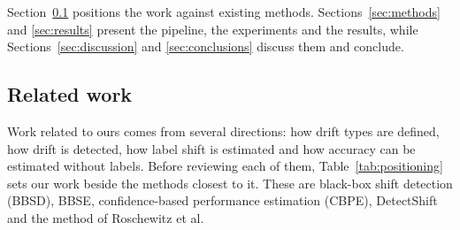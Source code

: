 \documentclass[pdflatex,referee,lineno,sn-basic]{sn-jnl}
\begin{document}
\noindent Section~\ref{sec:sota} positions the work against existing methods. Sections~\ref{sec:methods} and \ref{sec:results} present the pipeline, the experiments and the results, while Sections~\ref{sec:discussion} and \ref{sec:conclusions} discuss them and conclude.

\subsection{Related work}\label{sec:sota}

Work related to ours comes from several directions: how drift types are defined, how drift is detected, how label shift is estimated and how accuracy can be estimated without labels. Before reviewing each of them, Table~\ref{tab:positioning} sets our work beside the methods closest to it. These are black-box shift detection (BBSD), BBSE, confidence-based performance estimation (CBPE), DetectShift and the method of Roschewitz et al.
\end{document}
